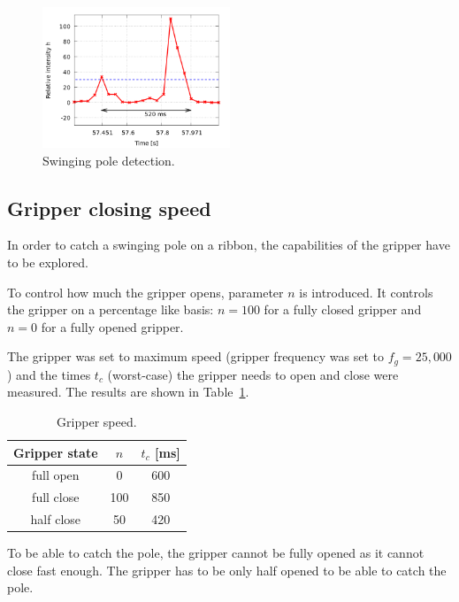             \begin{figure}[h]
            \includegraphics[width=0.5\textwidth]{SwingMeasurement.png}
            \centering
            \caption{Swinging pole detection.}
            \label{fig:SwingMeasurement}
            \end{figure}

        \subsection{Gripper closing speed}
            In order to catch a swinging pole on a ribbon, the capabilities of the gripper have to be explored.

            To control how much the gripper opens, parameter $n$ is introduced. It controls the gripper on a percentage like basis: $n=100$ for a fully closed gripper and $n=0$ for a fully opened gripper.

            The gripper was set to maximum speed (gripper frequency was set to $f_g = 25,000$) and the times $t_c$ (worst-case) the gripper needs to open and close were measured. The results are shown in Table~\ref{table:GripperClosingSpeeds}.

            \begin{table}\centering
            \begin{tabular}{@{}ccc@{}}\toprule
            Gripper state & $n$ & $ t_{c}$ [ms] \\ \midrule
            full open & 0 & 600 \\
            full close & 100 & 850 \\
            half close & 50 & 420 \\
            \bottomrule
            \end{tabular}
            \caption{Gripper speed.}
            \label{table:GripperClosingSpeeds}
            \end{table}

            To be able to catch the pole, the gripper cannot be fully opened as it cannot close fast enough. The gripper has to be only half opened to be able to catch the pole.

